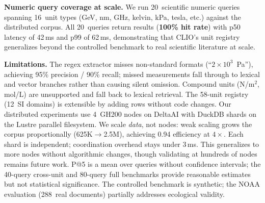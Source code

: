\textbf{Numeric query coverage at scale.}
We run 20~scientific numeric queries spanning 16~unit types (GeV, nm,
GHz, kelvin, kPa, tesla, etc.) against the distributed corpus. All
20~queries return results (\textbf{100\% hit rate}) with p50 latency
of 42\,ms and p99 of 62\,ms, demonstrating that CLIO's unit registry
generalizes beyond the controlled benchmark to real scientific
literature at scale.

\textbf{Limitations.} The regex extractor misses non-standard formats
(``$2 \times 10^3$~Pa''), achieving 95\% precision / 90\% recall;
missed measurements fall through to lexical and vector branches
rather than causing silent omission.
Compound units (N/m$^2$, mol/L) are unsupported and fall back to
lexical retrieval. The 58-unit registry (12~SI domains) is extensible
by adding rows without code changes.
Our distributed experiments use 4~GH200 nodes on DeltaAI with DuckDB
shards on the Lustre parallel filesystem. We scale \emph{data}, not
nodes: weak scaling grows the corpus proportionally
(625K$\to$2.5M), achieving 0.94 efficiency at $4\times$. Each shard
is independent; coordination overhead stays under 3\,ms. This
generalizes to more nodes without algorithmic changes, though
validating at hundreds of nodes remains future work.
P@5 is a mean over queries without confidence intervals; the
40-query cross-unit and 80-query full benchmarks provide reasonable
estimates but not statistical significance. The controlled benchmark
is synthetic; the NOAA evaluation (288~real documents) partially
addresses ecological validity.

